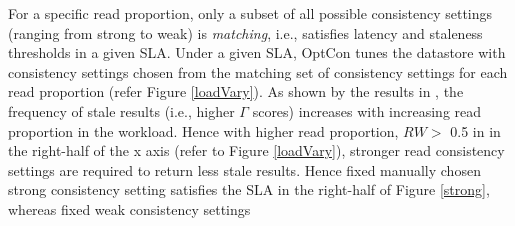 \documentclass[conference]{IEEEtran}
\begin{document}
   \par  For a specific read proportion, only
 a subset of all possible consistency settings (ranging from strong to weak) is \emph{matching}, i.e., satisfies latency and
 staleness thresholds in a given SLA.  %
 Under a given SLA, OptCon tunes the datastore with consistency settings chosen from the matching set of consistency settings for each read proportion (refer  Figure \ref{loadVary}).
  As shown by the results in \cite{DBLP:conf/cloud/GolabRAKWG13}, the frequency of stale results (i.e., higher
$\Gamma$ scores) increases with increasing read proportion in the workload.
Hence with higher read proportion, %
 $RW >$ 0.5 in
  in the right-half of the x axis (refer to Figure \ref{loadVary}), stronger read consistency settings are
  required to return less stale results. Hence fixed manually chosen strong consistency setting
   satisfies the SLA in the right-half of Figure \ref{strong}, whereas fixed weak consistency settings
\end{document}
